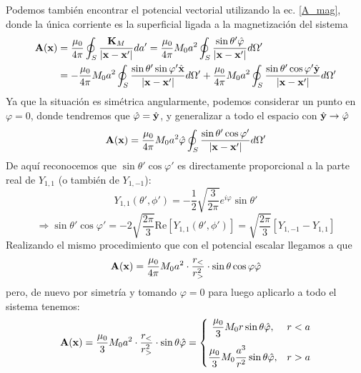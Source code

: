\documentclass[]{article}
\numberwithin{equation}{section}
\begin{document}
Podemos también encontrar el potencial vectorial utilizando la ec. \ref{A_mag}, donde la única corriente es la superficial ligada a la magnetización del sistema
\begin{align*}
	\mathbf{A}(\mathbf{x}) &= \frac{\mu_{0}}{4 \pi} \oint_{S} \frac{\mathbf{K}_{M}}{|\mathbf{x} - \mathbf{x}'|} da' = \frac{\mu_{0}}{4 \pi} M_0 a^2 \oint_{S} \frac{\sin\theta' \hat{\mathbf{\varphi}}}{|\mathbf{x} - \mathbf{x}'|} d\Omega'\\
	&= -\frac{\mu_{0}}{4 \pi} M_0 a^2 \oint_{S} \frac{\sin\theta' \sin\varphi' \hat{\mathbf{x}}}{|\mathbf{x} - \mathbf{x}'|} d\Omega' + \frac{\mu_{0}}{4 \pi} M_0 a^2 \oint_{S} \frac{\sin\theta' \cos\varphi' \hat{\mathbf{y}}}{|\mathbf{x} - \mathbf{x}'|} d\Omega'
\end{align*}
Ya que la situación es simétrica angularmente, podemos considerar un punto en \(\varphi = 0\), donde tendremos que \(\hat{\mathbf{\varphi}} = \hat{\mathbf{y}}\), y generalizar a todo el espacio con \(\hat{\mathbf{y}} \rightarrow \hat{\mathbf{\varphi}}\)
\begin{equation*}
	\mathbf{A}(\mathbf{x}) = \frac{\mu_{0}}{4 \pi} M_0 a^2 \hat{\mathbf{\varphi}} \oint_{S} \frac{\sin\theta' \cos\varphi'}{|\mathbf{x} - \mathbf{x}'|} d\Omega'
\end{equation*}
De aquí reconocemos que \(\sin\theta' \cos\varphi'\) es directamente proporcional a la parte real de \(Y_{1,1}\) (o también de \(Y_{1,-1}\)):
\begin{equation}
	Y_{1,1}(\theta',\phi') = -\frac{1}{2}\sqrt{\frac{3}{2 \pi}} e^{i \varphi} \sin\theta'
\end{equation}
\begin{equation}
	\Rightarrow \sin\theta' \cos\varphi' = -2\sqrt{\frac{2 \pi}{3}} \mathrm{Re}\!\left[Y_{1,1}(\theta',\phi')\right] = \sqrt{\frac{2 \pi}{3}}\left[Y_{1,-1} - Y_{1,1} \right]
\end{equation}
Realizando el mismo procedimiento que con el potencial escalar llegamos a que
\begin{equation*}
	\mathbf{A}(\mathbf{x}) = \frac{\mu_{0}}{4 \pi} M_0 a^2  \cdot \frac{r_{<}}{r_{>}^{2}} \cdot \sin\theta \cos\varphi \hat{\mathbf{\varphi}}
\end{equation*}
pero, de nuevo por simetría y tomando \(\varphi = 0\) para luego aplicarlo a todo el sistema tenemos:
\begin{equation}
	\n{A}(\xv) = \frac{\uo}{3} M_0 a^2  \cdot \frac{r_{<}}{r_{>}^{2}} \cdot \sin\theta \phat = \left\lbrace \begin{matrix}
		\dfrac{\uo}{3} M_0 r \sin\theta \phat, & r < a \vspace{3mm}\\
		\dfrac{\uo}{3} M_0 \dfrac{a^3}{r^{2}} \sin\theta \phat, & r > a
	\end{matrix}\right.
\end{equation}
\end{document}
